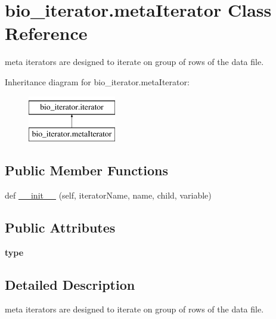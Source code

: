 \hypertarget{classbio__iterator_1_1meta_iterator}{}\section{bio\+\_\+iterator.\+meta\+Iterator Class Reference}
\label{classbio__iterator_1_1meta_iterator}


meta iterators are designed to iterate on group of rows of the data file.  


Inheritance diagram for bio\+\_\+iterator.\+meta\+Iterator\+:\begin{figure}[H]
\begin{center}
\leavevmode
\includegraphics[height=2.000000cm]{classbio__iterator_1_1meta_iterator}
\end{center}
\end{figure}
\subsection*{Public Member Functions}
\begin{DoxyCompactItemize}
\item 
def \hyperlink{classbio__iterator_1_1meta_iterator_ab6bae1e1672dd95d99f4a38ce4b01aee}{\+\_\+\+\_\+init\+\_\+\+\_\+} (self, iterator\+Name, name, child, variable)
\end{DoxyCompactItemize}
\subsection*{Public Attributes}
\begin{DoxyCompactItemize}
\item 
{\bfseries type}\hypertarget{classbio__iterator_1_1meta_iterator_acc36049ad5625b94dccbe176505cfaaa}{}\label{classbio__iterator_1_1meta_iterator_acc36049ad5625b94dccbe176505cfaaa}

\end{DoxyCompactItemize}


\subsection{Detailed Description}
meta iterators are designed to iterate on group of rows of the data file. 

